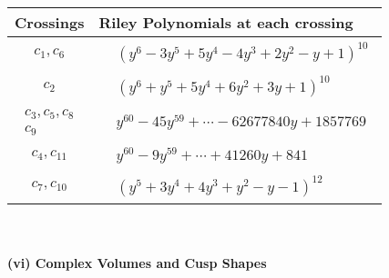 \documentclass[1p]{elsarticle_modified}
\theoremstyle{definition}
\begin{document}
\begin{tabular}{m{50pt}|m{274pt}}
Crossings & \hspace{64pt}Riley Polynomials at each crossing \\
\hline $$\begin{aligned}c_{1},c_{6}\end{aligned}$$&$\begin{aligned}
&(y^6-3 y^5+5 y^4-4 y^3+2 y^2- y+1)^{10}
\end{aligned}$\\
\hline $$\begin{aligned}c_{2}\end{aligned}$$&$\begin{aligned}
&(y^6+y^5+5 y^4+6 y^2+3 y+1)^{10}
\end{aligned}$\\
\hline $$\begin{aligned}c_{3},c_{5},c_{8}\\c_{9}\end{aligned}$$&$\begin{aligned}
&y^{60}-45 y^{59}+\cdots-62677840 y+1857769
\end{aligned}$\\
\hline $$\begin{aligned}c_{4},c_{11}\end{aligned}$$&$\begin{aligned}
&y^{60}-9 y^{59}+\cdots+41260 y+841
\end{aligned}$\\
\hline $$\begin{aligned}c_{7},c_{10}\end{aligned}$$&$\begin{aligned}
&(y^5+3 y^4+4 y^3+y^2- y-1)^{12}
\end{aligned}$\\
\hline
\end{tabular}\\~\\
\newpage\flushleft \textbf{(vi) Complex Volumes and Cusp Shapes}
\end{document}
